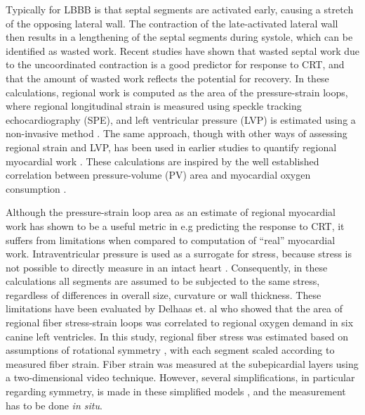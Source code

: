 Typically for LBBB is that septal segments are activated early,
causing a stretch of the opposing lateral wall. The 
contraction of the late-activated lateral wall then results in a 
lengthening of the septal segments during systole, which can be
identified as wasted work. Recent studies 
\cite{vecera2016wasted} have shown that wasted septal work due to the
uncoordinated contraction is a good predictor for response to
CRT, and that the amount of wasted work reflects the potential for
recovery. In these calculations, regional work is computed as the area
of the pressure-strain loops, where regional longitudinal strain is
measured using speckle tracking echocardiography (SPE), and left
ventricular pressure (LVP) is estimated using a non-invasive method
\cite{russell2012novel}. The same approach, though with other ways of
assessing regional strain and LVP, has been used in earlier studies to
quantify regional myocardial work
\cite{tyberg1974analysis,theroux1974regional}. These calculations are
inspired by the well established correlation between pressure-volume
(PV) area and myocardial oxygen consumption \cite{suga1979total}.



Although the pressure-strain loop area as an estimate of regional
myocardial work has shown to be a useful metric in e.g predicting the
response to CRT, it suffers from limitations when compared to computation of 
``real'' myocardial work. Intraventricular pressure is
used as a surrogate for stress, because stress is not possible to
directly measure in an intact heart
\cite{huisman1980measurement}. Consequently, in these calculations all
segments are assumed to be subjected to the same stress, regardless of
differences in overall size, curvature or wall thickness.  
These limitations have been evaluated by Delhaas et. al
\cite{delhaas1994regional} who showed that
the area of regional fiber stress-strain loops was correlated to
regional oxygen demand in six canine left ventricles. In this study,
regional fiber stress was estimated based on assumptions of rotational
symmetry \cite{arts1991relation}, with each segment scaled according to
measured fiber strain. Fiber strain was measured at the subepicardial
layers using a two-dimensional video technique.
However, several simplifications, in particular regarding symmetry, is
made in these simplified models \cite{zhang2011comparison}, and the
measurement has to be done {\it in situ}.

